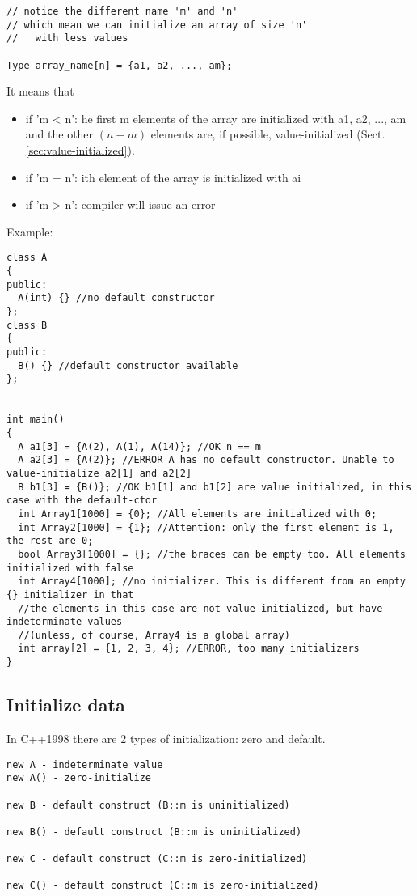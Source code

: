 \begin{verbatim}
// notice the different name 'm' and 'n'
// which mean we can initialize an array of size 'n'
//   with less values

Type array_name[n] = {a1, a2, ..., am};
\end{verbatim}
It means that
\begin{itemize}
  \item if 'm < n': he first m elements of the array are initialized with a1,
  a2, ..., am and the other $(n - m)$ elements are, if possible,
  value-initialized (Sect.\ref{sec:value-initialized}). 
  
  \item if 'm = n': ith element of the array is initialized with ai
  
  \item if 'm > n':  compiler will issue an error
\end{itemize}

Example:
\begin{lstlisting}
class A
{
public:
  A(int) {} //no default constructor
};
class B
{
public:
  B() {} //default constructor available
};


int main()
{
  A a1[3] = {A(2), A(1), A(14)}; //OK n == m
  A a2[3] = {A(2)}; //ERROR A has no default constructor. Unable to value-initialize a2[1] and a2[2]
  B b1[3] = {B()}; //OK b1[1] and b1[2] are value initialized, in this case with the default-ctor
  int Array1[1000] = {0}; //All elements are initialized with 0;
  int Array2[1000] = {1}; //Attention: only the first element is 1, the rest are 0;
  bool Array3[1000] = {}; //the braces can be empty too. All elements initialized with false
  int Array4[1000]; //no initializer. This is different from an empty {} initializer in that
  //the elements in this case are not value-initialized, but have indeterminate values 
  //(unless, of course, Array4 is a global array)
  int array[2] = {1, 2, 3, 4}; //ERROR, too many initializers
}
\end{lstlisting}

\subsection{Initialize data}

In C++1998 there are 2 types of initialization: zero and default.
\begin{verbatim}
new A - indeterminate value
new A() - zero-initialize

new B - default construct (B::m is uninitialized)

new B() - default construct (B::m is uninitialized)

new C - default construct (C::m is zero-initialized)

new C() - default construct (C::m is zero-initialized)
\end{verbatim}

